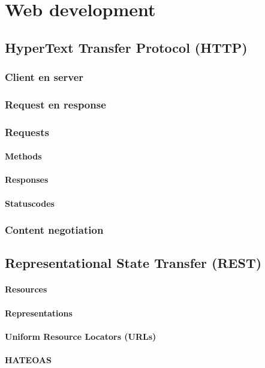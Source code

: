 \chapter{Web development}

\section{HyperText Transfer Protocol (HTTP)}
\subsection{Client en server}
\subsection{Request en response}
\subsection{Requests}
\subsubsection{Methods}
\subsubsection{Responses}
\subsubsection{Statuscodes}
\subsection{Content negotiation}

\section{Representational State Transfer (REST)}
\subsubsection{Resources}
\subsubsection{Representations}
\subsubsection{Uniform Resource Locators (URLs)}
\subsubsection{HATEOAS}

